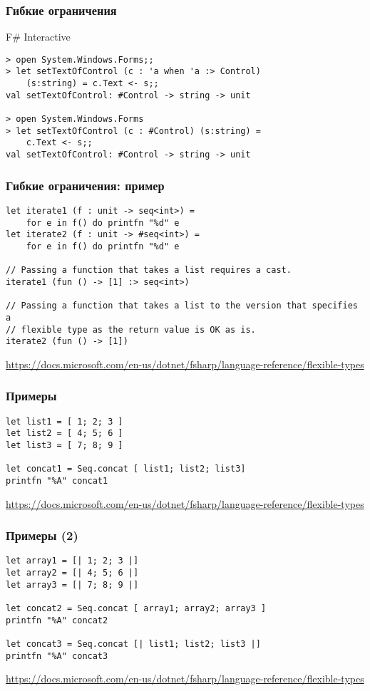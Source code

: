 \documentclass[xetex,mathserif,serif]{beamer}
\newcommand{\attribution}[1] {
    \begin{flushright}\begin{scriptsize}\textcolor{gray}{#1}\end{scriptsize}\end{flushright}
}
\begin{document}
    \begin{frame}[fragile]
        \frametitle{Гибкие ограничения}
        \begin{alertblock}{F\# Interactive}
            \begin{verbatim}
> open System.Windows.Forms;;
> let setTextOfControl (c : 'a when 'a :> Control) 
    (s:string) = c.Text <- s;;
val setTextOfControl: #Control -> string -> unit

> open System.Windows.Forms
> let setTextOfControl (c : #Control) (s:string) = 
    c.Text <- s;;
val setTextOfControl: #Control -> string -> unit
            \end{verbatim}
        \end{alertblock}
    \end{frame}

    \begin{frame}[fragile]
        \frametitle{Гибкие ограничения: пример}
        \begin{verbatim}
let iterate1 (f : unit -> seq<int>) =
    for e in f() do printfn "%d" e
let iterate2 (f : unit -> #seq<int>) =
    for e in f() do printfn "%d" e

// Passing a function that takes a list requires a cast.
iterate1 (fun () -> [1] :> seq<int>)

// Passing a function that takes a list to the version that specifies a
// flexible type as the return value is OK as is.
iterate2 (fun () -> [1])
        \end{verbatim}
        \attribution{\url{https://docs.microsoft.com/en-us/dotnet/fsharp/language-reference/flexible-types}}
    \end{frame}

    \begin{frame}[fragile]
        \frametitle{Примеры}
        \begin{verbatim}
let list1 = [ 1; 2; 3 ]
let list2 = [ 4; 5; 6 ]
let list3 = [ 7; 8; 9 ]

let concat1 = Seq.concat [ list1; list2; list3]
printfn "%A" concat1
        \end{verbatim}
        \attribution{\url{https://docs.microsoft.com/en-us/dotnet/fsharp/language-reference/flexible-types}}
    \end{frame}

    \begin{frame}[fragile]
        \frametitle{Примеры (2)}
        \begin{verbatim}
let array1 = [| 1; 2; 3 |]
let array2 = [| 4; 5; 6 |]
let array3 = [| 7; 8; 9 |]

let concat2 = Seq.concat [ array1; array2; array3 ]
printfn "%A" concat2

let concat3 = Seq.concat [| list1; list2; list3 |]
printfn "%A" concat3
        \end{verbatim}
        \attribution{\url{https://docs.microsoft.com/en-us/dotnet/fsharp/language-reference/flexible-types}}
    \end{frame}
\end{document}
